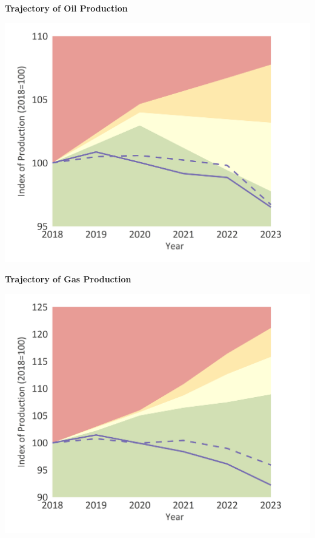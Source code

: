 \documentclass[10pt,table,a4]{article}\usepackage[]{graphicx}\usepackage[]{color}
\begin{document}
		\begin{minipage}[t]{.49\linewidth}
			\textbf{Trajectory of Oil Production }
		
			\includegraphics[trim = {0 0cm 0 0},width=1\linewidth]{Figures/Fig18}
			
		\end{minipage}	
		\hspace{.02\linewidth}
		\begin{minipage}[t]{.49\textwidth}
			\textbf{Trajectory of Gas Production }

			\includegraphics[trim = {0 0cm 0 0},width=1\linewidth]{Figures/Fig19}
			
		\end{minipage}
		
\end{document}
